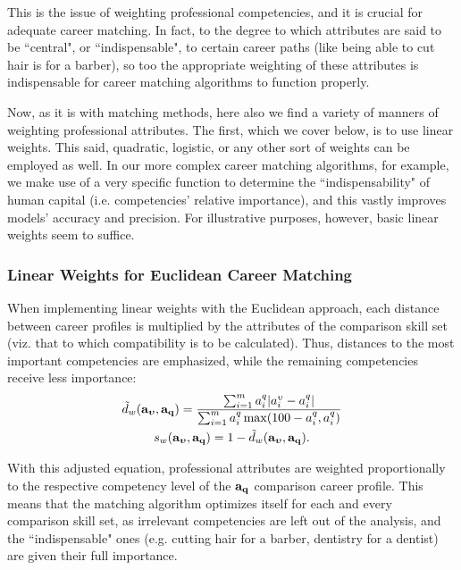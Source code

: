 \documentclass{article}
\begin{document}
This is the issue of weighting professional competencies, and it is crucial for adequate career matching. In fact, to the degree to which attributes are said to be ``central", or ``indispensable", to certain career paths (like being able to cut hair is for a barber), so too the appropriate weighting of these attributes is indispensable for career matching algorithms to function properly. 

Now, as it is with matching methods, here also we find a variety of manners of weighting professional attributes. The first, which we cover below, is to use linear weights. This said, quadratic, logistic, or any other sort of weights can be employed as well. In our more complex career matching algorithms, for example, we make use of a very specific function to determine the ``indispensability" of human capital (i.e. competencies' relative importance), and this vastly improves models' accuracy and precision. For illustrative purposes, however, basic linear weights seem to suffice.

\subsubsection{Linear Weights for Euclidean Career Matching}
When implementing linear weights with the Euclidean approach, each distance between career profiles is multiplied by the attributes of the comparison skill set (viz. that to which compatibility is to be calculated). Thus, distances to the most important competencies are emphasized, while the remaining competencies receive less importance:
\begin{gather}
\label{eqn:weighted_distance}
    \tilde{d}_w(\vb{a_{\boldsymbol{\upsilon}}}, \vb{a_{q}}) = 
    \frac{
    \sum_{i = 1}^{m}{
    a_{i}^{q} | a_{i}^{\upsilon} - a_{i}^{q} |
    }
    }{
    \sum_{i = 1}^{m}{
    a_{i}^{q} \max(100 - a_{i}^{q}, a_{i}^{q})
    }
    }
    \\ s_w(\vb{a_{\boldsymbol{\upsilon}}}, \vb{a_{q}}) = 1 - \tilde{d}_w(\vb{a_{\boldsymbol{\upsilon}}}, \vb{a_{q}})
.\end{gather}

With this adjusted equation, professional attributes are weighted proportionally to the respective competency level of the $\vb{a_{q}}$ comparison career profile. This means that the matching algorithm optimizes itself for each and every comparison skill set, as irrelevant competencies are left out of the analysis, and the ``indispensable" ones (e.g. cutting hair for a barber, dentistry for a dentist) are given their full importance.
\end{document}
